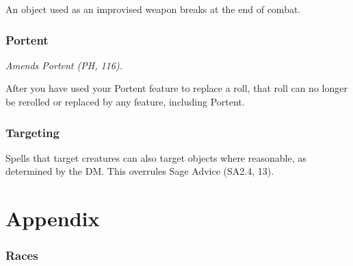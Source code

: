 \documentclass[letterpaper,twocolumn,openany,nodeprecatedcode]{dndbook}
\begin{document}
An object used as an improvised weapon breaks at the end of combat.

\subsection{Portent}
\textit{Amends Portent (PH, 116).}

After you have used your Portent feature to replace a roll, that roll can no longer be rerolled or replaced by any feature, including Portent.

\subsection{Targeting}
Spells that target creatures can also target objects where reasonable, as determined by the DM. This overrules Sage Advice (SA2.4, 13).







\chapter{Appendix}

\subsection{Races}
\end{document}
